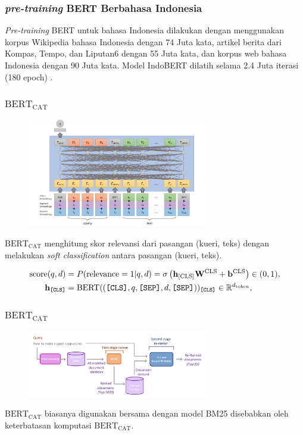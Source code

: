 \documentclass[10pt]{beamer}
\newcommand{\f}[1]{\textit{#1}}
\newcommand{\code}[1]{\texttt{#1}}
\begin{document}
\begin{frame}
    \frametitle{\f{pre-training} BERT Berbahasa Indonesia}

    \f{Pre-training} BERT untuk bahasa Indonesia dilakukan dengan menggunakan korpus Wikipedia bahasa Indonesia dengan 74 Juta kata, artikel berita dari Kompas, Tempo, dan Liputan6 dengan 55 Juta kata, dan korpus web bahasa Indonesia dengan 90 Juta kata. Model IndoBERT dilatih selama 2.4 Juta iterasi (180 epoch) \citep{indobert}.

\end{frame}
    

\begin{frame}
    \frametitle{$\text{BERT}_{\text{CAT}}$}

    \begin{figure}[!ht]
        \centering
        \includegraphics[width=0.7\textwidth]{assets/pics/bertcat.png}
    \end{figure}

    $\text{BERT}_{\text{CAT}}$ menghitung skor relevansi dari pasangan (kueri, teks) dengan melakukan \f{soft classification} antara pasangan (kueri, teks).

    \begin{align*}
        \text{score}(q,d) &= P(\text{relevance} = 1 | q, d) = \sigma\left(  \mathbf{h}_{\text{[CLS]}} \mathbf{W}^{\text{CLS}}+\mathbf{b}^{\text{CLS}} \right) \in (0,1), \\
        \mathbf{h}_{\text{\code{[CLS]}}} &= \text{BERT}((\text{\code{[CLS]}}, q, \text{\code{[SEP]}}, d, \text{\code{[SEP]}}))_{\text{\code{[CLS]}}} \in \mathbb{R}^{d_{\text{token}}},
    \end{align*}
\end{frame}

\begin{frame}
    \frametitle{$\text{BERT}_{\text{CAT}}$}
    \begin{figure}[!ht]
        \centering
        \includegraphics[width=0.7\textwidth]{assets/pics/neural-ir.png}
        \label{fig:bert-cat-withbm25}
    \end{figure}
    $\text{BERT}_{\text{CAT}}$ biasanya digunakan bersama dengan model BM25 disebabkan oleh keterbatasan komputasi $\text{BERT}_{\text{CAT}}$.
\end{frame}
\end{document}
